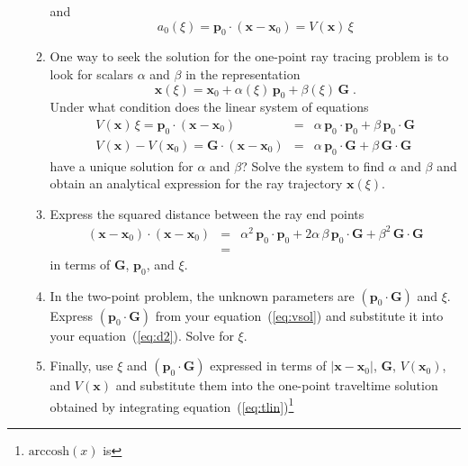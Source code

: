 \begin{enumerate}
\begin{enumerate}
  and
  \begin{equation}
    \label{eq:a0sol}
    a_0(\xi) = \mathbf{p}_0 \cdot (\mathbf{x} - \mathbf{x}_0) = V(\mathbf{x})\,\xi
  \end{equation}
\item One way to seek the solution for the one-point ray tracing
  problem is to look for scalars $\alpha$ and $\beta$ in the representation
\begin{equation}
  \label{eq:xsol}
  \mathbf{x}(\xi) = \mathbf{x}_0 + \alpha(\xi)\,\mathbf{p}_0 + \beta(\xi)\,\mathbf{G}\;.
\end{equation}
Under what condition does the linear system of equations
\begin{eqnarray}
  \label{eq:linsys1}
  V(\mathbf{x})\,\xi = \mathbf{p}_0 \cdot (\mathbf{x} - \mathbf{x}_0) & = & 
  \alpha\,\mathbf{p}_0 \cdot \mathbf{p}_0 + \beta\,\mathbf{p}_0 \cdot \mathbf{G} \\
  \label{eq:linsys2}
  V(\mathbf{x}) - V(\mathbf{x}_0) = \mathbf{G} \cdot (\mathbf{x} - \mathbf{x}_0) & = &
  \alpha\,\mathbf{p}_0 \cdot \mathbf{G} + \beta\,\mathbf{G} \cdot \mathbf{G}
\end{eqnarray}
have a unique solution for $\alpha$ and $\beta$? Solve the system to
find $\alpha$ and $\beta$ and obtain an analytical expression for
the ray trajectory $\mathbf{x}(\xi)$.
\item Express the squared distance between the ray end points
  \begin{eqnarray}
  \nonumber
    (\mathbf{x} - \mathbf{x}_0) \cdot (\mathbf{x} - \mathbf{x}_0) & = &
    \alpha^2\,\mathbf{p}_0 \cdot \mathbf{p}_0 + 2 \alpha\,\beta\,\mathbf{p}_0 \cdot \mathbf{G} +
    \beta^2\,\mathbf{G} \cdot \mathbf{G} \\
    & = & 
    \label{eq:d2} 
  \end{eqnarray}
  in terms of $\mathbf{G}$, $\mathbf{p}_0$, and $\xi$. 
\item In the two-point problem, the unknown
  parameters are $(\mathbf{p}_0 \cdot \mathbf{G})$ and $\xi$.
  Express $(\mathbf{p}_0 \cdot \mathbf{G})$ from your
  equation~(\ref{eq:vsol}) and substitute it into your
  equation~(\ref{eq:d2}). Solve for $\xi$. 
\item Finally, use $\xi$ and $(\mathbf{p}_0 \cdot \mathbf{G})$ 
  expressed in terms of $|\mathbf{x} - \mathbf{x}_0|$,
  $\mathbf{G}$, $V(\mathbf{x}_0)$, and $V(\mathbf{x})$ and
  substitute them into the one-point traveltime solution obtained by
  integrating equation~(\ref{eq:tlin})\footnote{$\mbox{arccosh}(x)$ is
}
\end{enumerate}
\end{enumerate}
